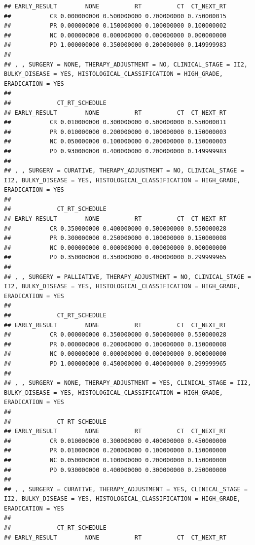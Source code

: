 \documentclass[]{article}
\begin{document}
\begin{verbatim}
## EARLY_RESULT        NONE          RT          CT  CT_NEXT_RT
##           CR 0.000000000 0.500000000 0.700000000 0.750000015
##           PR 0.000000000 0.150000000 0.100000000 0.100000002
##           NC 0.000000000 0.000000000 0.000000000 0.000000000
##           PD 1.000000000 0.350000000 0.200000000 0.149999983
## 
## , , SURGERY = NONE, THERAPY_ADJUSTMENT = NO, CLINICAL_STAGE = II2, BULKY_DISEASE = YES, HISTOLOGICAL_CLASSIFICATION = HIGH_GRADE, ERADICATION = YES
## 
##             CT_RT_SCHEDULE
## EARLY_RESULT        NONE          RT          CT  CT_NEXT_RT
##           CR 0.010000000 0.300000000 0.500000000 0.550000011
##           PR 0.010000000 0.200000000 0.100000000 0.150000003
##           NC 0.050000000 0.100000000 0.200000000 0.150000003
##           PD 0.930000000 0.400000000 0.200000000 0.149999983
## 
## , , SURGERY = CURATIVE, THERAPY_ADJUSTMENT = NO, CLINICAL_STAGE = II2, BULKY_DISEASE = YES, HISTOLOGICAL_CLASSIFICATION = HIGH_GRADE, ERADICATION = YES
## 
##             CT_RT_SCHEDULE
## EARLY_RESULT        NONE          RT          CT  CT_NEXT_RT
##           CR 0.350000000 0.400000000 0.500000000 0.550000028
##           PR 0.300000000 0.250000000 0.100000000 0.150000008
##           NC 0.000000000 0.000000000 0.000000000 0.000000000
##           PD 0.350000000 0.350000000 0.400000000 0.299999965
## 
## , , SURGERY = PALLIATIVE, THERAPY_ADJUSTMENT = NO, CLINICAL_STAGE = II2, BULKY_DISEASE = YES, HISTOLOGICAL_CLASSIFICATION = HIGH_GRADE, ERADICATION = YES
## 
##             CT_RT_SCHEDULE
## EARLY_RESULT        NONE          RT          CT  CT_NEXT_RT
##           CR 0.000000000 0.350000000 0.500000000 0.550000028
##           PR 0.000000000 0.200000000 0.100000000 0.150000008
##           NC 0.000000000 0.000000000 0.000000000 0.000000000
##           PD 1.000000000 0.450000000 0.400000000 0.299999965
## 
## , , SURGERY = NONE, THERAPY_ADJUSTMENT = YES, CLINICAL_STAGE = II2, BULKY_DISEASE = YES, HISTOLOGICAL_CLASSIFICATION = HIGH_GRADE, ERADICATION = YES
## 
##             CT_RT_SCHEDULE
## EARLY_RESULT        NONE          RT          CT  CT_NEXT_RT
##           CR 0.010000000 0.300000000 0.400000000 0.450000000
##           PR 0.010000000 0.200000000 0.100000000 0.150000000
##           NC 0.050000000 0.100000000 0.200000000 0.150000000
##           PD 0.930000000 0.400000000 0.300000000 0.250000000
## 
## , , SURGERY = CURATIVE, THERAPY_ADJUSTMENT = YES, CLINICAL_STAGE = II2, BULKY_DISEASE = YES, HISTOLOGICAL_CLASSIFICATION = HIGH_GRADE, ERADICATION = YES
## 
##             CT_RT_SCHEDULE
## EARLY_RESULT        NONE          RT          CT  CT_NEXT_RT

\end{verbatim}
\end{document}
